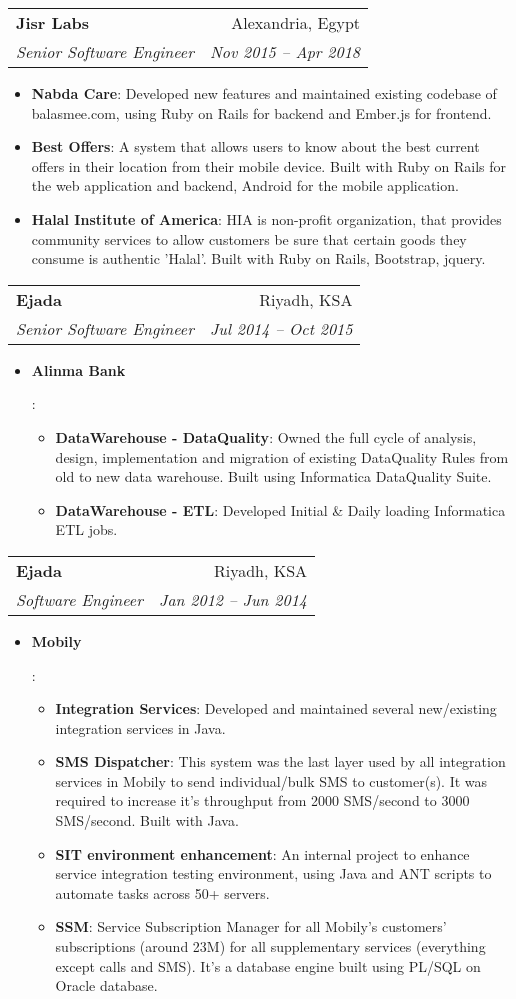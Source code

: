 \documentclass[letterpaper,11pt]{article}
\makeatletter
\newcommand{\resumeItem}[2]{
  \item\small{
    \textbf{#1}{: #2 \vspace{-2pt}}
  }
}
\newcommand{\resumeSubheading}[4]{
  \vspace{-1pt}\item
    \begin{tabular*}{0.97\textwidth}{l@{\extracolsep{\fill}}r}
      \textbf{#1} & #2 \\
      \textit{\small#3} & \textit{\small #4} \\
    \end{tabular*}\vspace{-4pt}
}
\newcommand{\resumeItemListStart}{\begin{itemize}}
\newcommand{\resumeItemListEnd}{\end{itemize}\vspace{-5pt}}
\makeatother
\begin{document}
    \resumeSubheading
      {Jisr Labs}{Alexandria, Egypt}
      {Senior Software Engineer}{Nov 2015 -- Apr 2018}
           \resumeItemListStart
       \resumeItem{Nabda Care}
          {Developed new features and maintained existing codebase of balasmee.com, using Ruby on Rails for backend and Ember.js for frontend.}
        \resumeItem{Best Offers}{A system that allows users to know about the best current offers in their location from their mobile device. Built with Ruby on Rails for the web application and backend, Android for the mobile application.}
      \resumeItem{Halal Institute of America}
	 {HIA is non-profit organization, that provides community services to allow customers be sure that certain goods they consume is authentic 'Halal'. Built with Ruby on Rails, Bootstrap, jquery.}
      \resumeItemListEnd

    \resumeSubheading
      {Ejada}{Riyadh, KSA}
      {Senior Software Engineer}{Jul 2014 -- Oct 2015}
     \resumeItemListStart
      \resumeItem{Alinma Bank} {
      \resumeItemListStart
        \resumeItem{DataWarehouse - DataQuality}
          {Owned the full cycle of analysis, design, implementation and migration of existing DataQuality Rules from old to new data warehouse. Built using Informatica DataQuality Suite.}
        \resumeItem{DataWarehouse - ETL}
          {Developed Initial \& Daily loading Informatica ETL jobs.}
      \resumeItemListEnd
      }
     \resumeItemListEnd

    \resumeSubheading
      {Ejada}{Riyadh, KSA}
      {Software Engineer}{Jan 2012 -- Jun 2014}
          \resumeItemListStart
      \resumeItem{Mobily} {
      \resumeItemListStart
         \resumeItem{Integration Services}
          {Developed and maintained several new/existing integration services in Java.}
        \resumeItem{SMS Dispatcher}
          {This system was the last layer used by all integration services in Mobily to send individual/bulk SMS to customer(s). It was required to increase it's throughput from 2000 SMS/second to 3000 SMS/second. Built with Java.}
        \resumeItem{SIT environment enhancement}
          {An internal project to enhance service integration testing environment, using Java and ANT scripts to automate tasks across 50+ servers.}  
        \resumeItem{SSM}{Service Subscription Manager for all Mobily's customers' subscriptions (around 23M) for all supplementary services (everything except calls and SMS). It's a database engine built using PL/SQL on Oracle database.}
      \resumeItemListEnd 
      }
    \resumeItemListEnd
    
\end{document}

